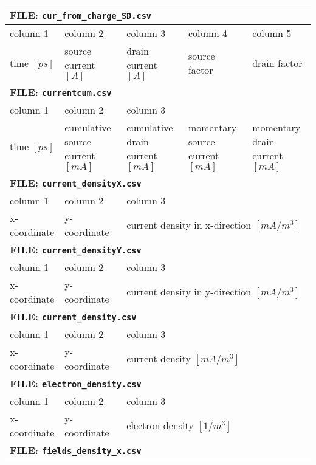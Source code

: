 \begin{table}[ht!]
\centering
\begin{tabular}{|m{2.7cm}|m{2.7cm}|m{2.7cm}|m{2.7cm}|m{2.7cm}|}
\hline
  \multicolumn{5}{|l|}{\textbf{FILE: \texttt{cur\_from\_charge\_SD.csv}}} \\
\hline
  column 1 & column 2 & column 3 & column 4 & column 5  \\
\hline
  time $[ps]$ & source current $[A]$ & drain current $[A]$ & source factor & drain factor \\
\hline \hline
  \multicolumn{5}{|l|}{\textbf{FILE: \texttt{currentcum.csv}}} \\
\hline
  column 1 & column 2 & \multicolumn{3}{|l|}{column 3} \\
\hline
  time $[ps]$ & cumulative source current $[mA]$ & cumulative drain current $[mA]$ & momentary source current $[mA]$ & momentary drain current $[mA]$ \\
\hline \hline
  \multicolumn{5}{|l|}{\textbf{FILE: \texttt{current\_densityX.csv}}} \\
\hline
  column 1 & column 2 & \multicolumn{3}{|l|}{column 3} \\
\hline
  x-coordinate & y-coordinate & \multicolumn{3}{|l|}{current density in x-direction $[mA/m^3]$} \\
\hline \hline
  \multicolumn{5}{|l|}{\textbf{FILE: \texttt{current\_densityY.csv}}} \\
\hline
  column 1 & column 2 & \multicolumn{3}{|l|}{column 3} \\
\hline
  x-coordinate & y-coordinate & \multicolumn{3}{|l|}{current density in y-direction $[mA/m^3]$} \\
\hline \hline
  \multicolumn{5}{|l|}{\textbf{FILE: \texttt{current\_density.csv}}} \\
\hline
  column 1 & column 2 & \multicolumn{3}{|l|}{column 3} \\
\hline
  x-coordinate & y-coordinate & \multicolumn{3}{|l|}{current density $[mA/m^3]$} \\
\hline \hline
  \multicolumn{5}{|l|}{\textbf{FILE: \texttt{electron\_density.csv}}} \\
\hline
  column 1 & column 2 & \multicolumn{3}{|l|}{column 3} \\
\hline
  x-coordinate & y-coordinate & \multicolumn{3}{|l|}{electron density $[1/m^3]$} \\
\hline \hline
  \multicolumn{5}{|l|}{\textbf{FILE: \texttt{fields\_density\_x.csv}}} \\

\end{tabular}
\end{table}

